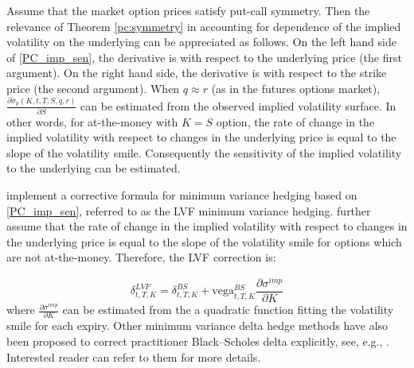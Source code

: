 \documentclass[letterpaper,12pt,titlepage,oneside,final]{book}
\numberwithin{equation}{section}
\theoremstyle{definition}
\newcommand{\impsigma}{\breve{\sigma}}
\begin{document}
Assume that the market option prices satisfy put-call symmetry. Then
the relevance of Theorem \ref{pc:symmetry} in accounting for dependence of the implied volatility on the underlying can be appreciated as follows.
On the left hand side of \eqref{PC_imp_sen}, the derivative is with respect to  the underlying price (the first argument). On the right hand side, the derivative is with respect to the strike price (the second argument).
When $q \approx r$ (as in the futures options market), $\frac{\partial \impsigma_p(K, t,T,S , q, r)}{\partial S}$ can be estimated from the observed implied volatility surface. In other words, for at-the-money with $K=S$ option, the rate of change in the implied volatility with respect to changes in the underlying price is equal to the slope of the volatility smile.
Consequently the sensitivity of the implied volatility to the underlying  can be estimated. 

\citet{hulloptimal}  implement a corrective formula for minimum variance hedging  based on  \eqref{PC_imp_sen}, referred to as the LVF minimum variance hedging. \citet{hulloptimal} further assume that the rate of change in the implied volatility with respect to changes in the underlying price is equal to the slope of the volatility smile  for options which are not at-the-money. Therefore, the LVF correction is:

    \begin{equation}
        \delta^{LVF}_{t,T,K}=\delta^{BS}_{t,T,K}+\text{vega}^{BS}_{t,T,K} \frac{\partial \sigma^{imp}}{\partial K}
        \label{eq:HullWhiteLVF}
    \end{equation}  
where  $\frac{\partial \sigma^{imp}}{\partial K}$ can be estimated from the  a quadratic function fitting the volatility smile for each expiry. Other minimum variance delta hedge methods have also been proposed to correct practitioner Black–Scholes delta explicitly, see, e.g., \citep{bakshi1997empirical,crepey2004,barlett2006,poulsen2009,alexander2012}. Interested reader can refer to them for more details.
\end{document}
